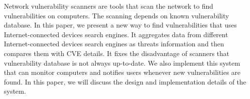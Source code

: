 
\begin{eabstract}
  Network vulnerability scanners are tools that scan the network to find vulnerabilities on computers. 
  The scanning depends on known vulnerability database. In this paper, 
  we present a new way to find vulnerabilities that uses Internet-connected devices search engines. 
  It aggregates data from different Internet-connected devices search engines as threats information and then compares them with CVE details. 
  It fixes the disadvantage of scanners that vulnerability database is not always up-to-date. 
  We also implement this system that can monitor computers and notifies users whenever new vulnerabilities are found. 
  In this paper, we will discuss the design and implementation details of the system.
\end{eabstract}

